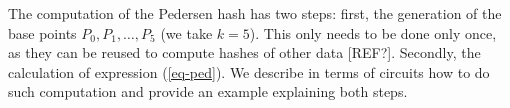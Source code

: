	The computation of the Pedersen hash has two steps: first, the generation of the base points $P_0, P_1, \dots, P_5$ (we take $k=5$). This only needs to be done only once, as they can be reused to compute hashes of other data {[REF?]}. Secondly, the calculation of expression (\ref{eq-ped}). We describe in terms of circuits how to do such computation and provide an example explaining both steps.  
	
